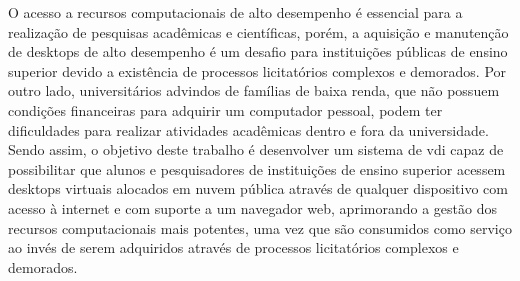 
\begin{resumoutfpr}

O acesso a recursos computacionais de alto desempenho é essencial para a realização de pesquisas acadêmicas e científicas, porém, a aquisição e manutenção de \glspl{desktop} de alto desempenho é um desafio para instituições públicas de ensino superior devido a existência de processos licitatórios complexos e demorados. Por outro lado, universitários advindos de famílias de baixa renda, que não possuem condições financeiras para adquirir um computador pessoal, podem ter dificuldades para realizar atividades acadêmicas dentro e fora da universidade. Sendo assim, o objetivo deste trabalho é desenvolver um sistema de \gls{vdi} capaz de possibilitar que alunos e pesquisadores de instituições de ensino superior acessem \glspl{desktop} virtuais alocados em nuvem pública através de qualquer dispositivo com acesso à internet e com suporte a um navegador web, aprimorando a gestão dos recursos computacionais mais potentes, uma vez que são consumidos como serviço ao invés de serem adquiridos através de processos licitatórios complexos e demorados.



 
 
 

\end{resumoutfpr}

